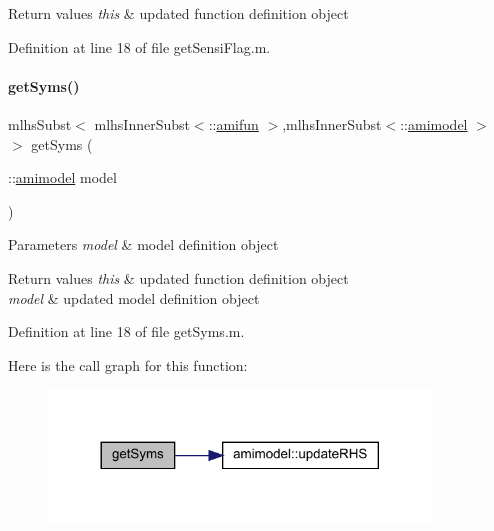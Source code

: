 \begin{DoxyRetVals}{Return values}
{\em this} & updated function definition object \\
\hline
\end{DoxyRetVals}


Definition at line 18 of file get\+Sensi\+Flag.\+m.

\mbox{\label{classamifun_a44e49602645d85f94841f38e4673fa1a}} 
\paragraph{\texorpdfstring{get\+Syms()}{getSyms()}}
{\footnotesize\ttfamily mlhs\+Subst$<$ mlhs\+Inner\+Subst$<$\+::\mbox{\hyperlink{classamifun}{amifun}} $>$,mlhs\+Inner\+Subst$<$\+::\mbox{\hyperlink{classamimodel}{amimodel}} $>$ $>$ get\+Syms (\begin{DoxyParamCaption}\item[{\+::\mbox{\hyperlink{classamimodel}{amimodel}}}]{model }\end{DoxyParamCaption})}


\begin{DoxyParams}{Parameters}
{\em model} & model definition object\\
\hline
\end{DoxyParams}

\begin{DoxyRetVals}{Return values}
{\em this} & updated function definition object \\
\hline
{\em model} & updated model definition object \\
\hline
\end{DoxyRetVals}


Definition at line 18 of file get\+Syms.\+m.

Here is the call graph for this function\+:
\nopagebreak
\begin{figure}[H]
\begin{center}
\leavevmode
\includegraphics[width=288pt]{classamifun_a44e49602645d85f94841f38e4673fa1a_cgraph}
\end{center}
\end{figure}


